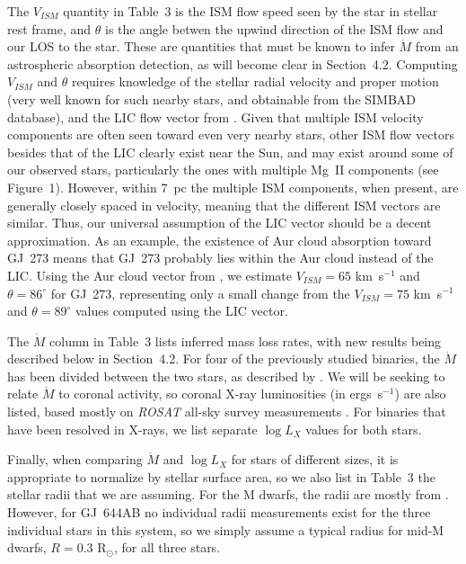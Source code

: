 \documentclass[preprint]{aastex}
\begin{document}
     The $V_{ISM}$ quantity in Table~3 is the ISM flow speed seen
by the star in stellar rest frame, and $\theta$ is the angle betwen
the upwind direction of the ISM flow and our LOS to the star.
These are quantities that must be known
to infer $\dot{M}$ from an astrospheric absorption detection, as
will become clear in Section~4.2.  Computing $V_{ISM}$ and $\theta$
requires knowledge of the stellar radial velocity and proper motion
(very well known for such nearby stars, and
obtainable from the SIMBAD database), and the LIC flow vector from
\citet{sr08}.  Given that multiple ISM velocity
components are often seen toward even very nearby stars, other
ISM flow vectors besides that of the LIC clearly exist near the Sun,
and may exist around some of our observed stars, particularly the
ones with multiple Mg~II components (see Figure~1).  However, within
7~pc the multiple ISM components, when present, are generally
closely spaced in velocity, meaning that the different ISM
vectors are similar.  Thus, our universal assumption of the LIC
vector should be a decent approximation.  As an example, the
existence of Aur cloud absorption toward GJ~273 means that GJ~273
probably lies within the Aur cloud instead of the LIC.  Using the
Aur cloud vector from \citet{sr08}, we estimate
$V_{ISM}=65$ km~s$^{-1}$ and $\theta=86^{\circ}$ for GJ~273,
representing only a small change from the $V_{ISM}=75$ km~s$^{-1}$ and
$\theta=89^{\circ}$ values computed using the LIC vector.

     The $\dot{M}$ column in Table~3 lists inferred mass loss
rates, with new results being described below in Section~4.2.
For four of the previously studied binaries, the $\dot{M}$
has been divided between the two stars, as described by \citet{bew18}.
We will be seeking to relate $\dot{M}$ to coronal
activity, so coronal X-ray luminosities (in ergs~s$^{-1}$) are
also listed, based mostly on {\em ROSAT} all-sky survey
measurements \citep{js04}.  For binaries that
have been resolved in X-rays, we list separate $\log L_X$
values for both stars.

     Finally, when comparing $\dot{M}$ and $\log L_X$ for
stars of different sizes, it is appropriate to
normalize by stellar surface area, so we also list in
Table~3 the stellar radii that we are assuming.  For
the M dwarfs, the radii are mostly from \citet{erh19}.
However, for GJ~644AB no individual radii
measurements exist for the three individual stars in this
system, so we simply assume a typical radius for mid-M dwarfs,
$R=0.3$ R$_{\odot}$, for all three stars.
\end{document}
